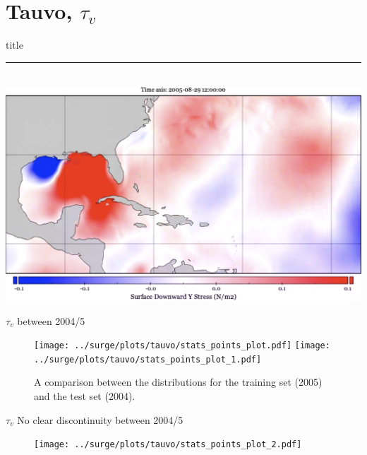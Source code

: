 \documentclass[usenames, dvipsnames]{beamer}
\begin{document}
\section{Tauvo, $\tau_v$ }
    \begin{frame}[plain]
        \vfill
      \centering
      \begin{beamercolorbox}[sep=8pt,center,shadow=true,rounded=true]{title}
        \insertsectionhead\par%
        \color{oxfordblue}\noindent\rule{10cm}{1pt} \\
                \includegraphics[width=0.93\linewidth]{images/example-images/tauvo.png}
      \end{beamercolorbox}
      \vfill
  \end{frame}

\begin{frame}{$\tau_v$ between 2004/5 }
\vspace{-20pt}
\begin{figure}[htb!]
    \centering
    \texttt{[image: ../surge/plots/tauvo/stats\_points\_plot.pdf]}
     \hspace{0pt} \texttt{[image: ../surge/plots/tauvo/stats\_points\_plot\_1.pdf]}
    \vspace{-7pt}
    \caption{A comparison between the distributions for
             the training set (2005) and the test set (2004).}
    \label{fig:}
\end{figure}
\end{frame}


\begin{frame}{$\tau_v$  No clear discontinuity between 2004/5  }
\vspace{-20pt}
\begin{figure}[htb!]
    \centering
    \texttt{[image: ../surge/plots/tauvo/stats\_points\_plot\_2.pdf]}
    \vspace{-7pt}
    \caption{}
    \label{fig:}
\end{figure}
\end{frame}
\end{document}

